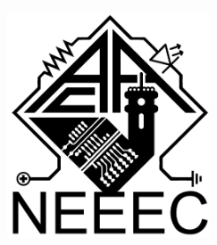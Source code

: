 %
%
%
% 

\begin{titlepage}

\newcommand{\HRule}{\rule{\linewidth}{0.3mm}} %

\center %
\textcolor{white}{.} \\[1.8cm]
\includegraphics[width=0.45\textwidth]{imagens/neeec.png}\\[1cm] %
 



\end{titlepage}
